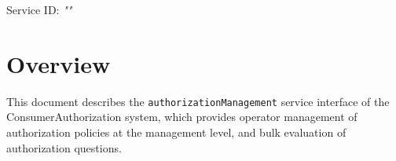 \documentclass[a4paper]{arrowhead}
\begin{document}
\sloppy

\ArrowheadSetup

\begin{center}
  \vspace*{1cm}
  \huge{\arrowtitle}

  \vspace*{0.2cm}
  \LARGE{\arrowtype}
  \vspace*{1cm}

  \Large{Service ID: \textit{"\arrowid"}}

  \vspace*{\fill}


  \vspace*{1cm}
  \vspace*{\fill}

  \begin{abstract}
    This document describes the HTTP/1.1 protocol with TLS payload security and JSON payload encoding variant of the \texttt{authorization\allowbreak{}Management} service of the ConsumerAuthorization system.
  \end{abstract}

  \vspace*{1cm}
\end{center}

\newpage

\tableofcontents
\newpage

\section{Overview}
\label{sec:overview}

This document describes the \texttt{authorization\allowbreak{}Management} service interface of the ConsumerAuthorization system, which provides operator management of authorization policies at the management level, and bulk evaluation of authorization questions.
\end{document}

